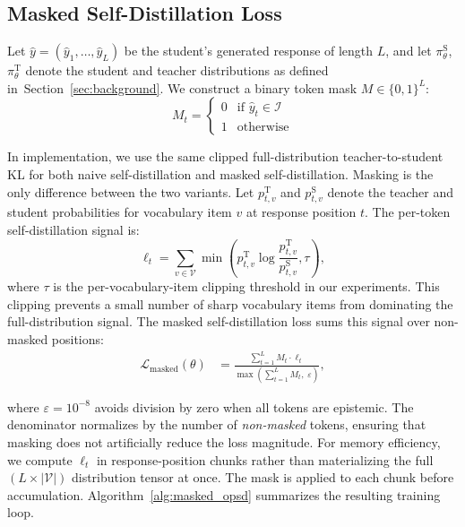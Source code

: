\documentclass[11pt]{article}
\begin{document}
\subsection{Masked Self-Distillation Loss}

Let $\hat{y} = (\hat{y}_1, \dots, \hat{y}_L)$ be the student's generated response of length $L$, and let $\pi_\theta^{\text{S}}$, $\pi_\theta^{\text{T}}$ denote the student and teacher distributions as defined in~Section~\ref{sec:background}.
We construct a binary token mask $M \in \{0,1\}^L$:
\begin{equation}
    M_t = \begin{cases}
        0 & \text{if } \hat{y}_t \in \mathcal{I} \\
        1 & \text{otherwise}
    \end{cases}
\end{equation}

In implementation, we use the same clipped full-distribution teacher-to-student KL for both naive self-distillation and masked self-distillation. Masking is the only difference between the two variants.
Let $p^{\text{T}}_{t,v}$ and $p^{\text{S}}_{t,v}$ denote the teacher and student probabilities for vocabulary item $v$ at response position $t$.
The per-token self-distillation signal is:
\begin{equation}
    \ell_t =
    \sum_{v \in \mathcal{V}}
    \min\left(
        p^{\text{T}}_{t,v}
        \log \frac{p^{\text{T}}_{t,v}}{p^{\text{S}}_{t,v}},
        \tau
    \right),
\label{eq:clipped_kl}
\end{equation}
where $\tau$ is the per-vocabulary-item clipping threshold in our experiments.
This clipping prevents a small number of sharp vocabulary items from dominating the full-distribution signal.
The masked self-distillation loss sums this signal over non-masked positions:
\begin{equation}
\begin{aligned}
    \mathcal{L}_{\text{masked}}(\theta)
    &=
    \frac{\sum_{t=1}^L M_t \cdot \ell_t}
    {\max(\sum_{t=1}^L M_t,\; \varepsilon)} ,
\end{aligned}
\label{eq:masked_loss}
\end{equation}

where $\varepsilon = 10^{-8}$ avoids division by zero when all tokens are epistemic.
The denominator normalizes by the number of \textit{non-masked} tokens, ensuring that masking does not artificially reduce the loss magnitude.
For memory efficiency, we compute $\ell_t$ in response-position chunks rather than materializing the full $(L \times |\mathcal{V}|)$ distribution tensor at once. The mask is applied to each chunk before accumulation.
Algorithm~\ref{alg:masked_opsd} summarizes the resulting training loop.
\end{document}
